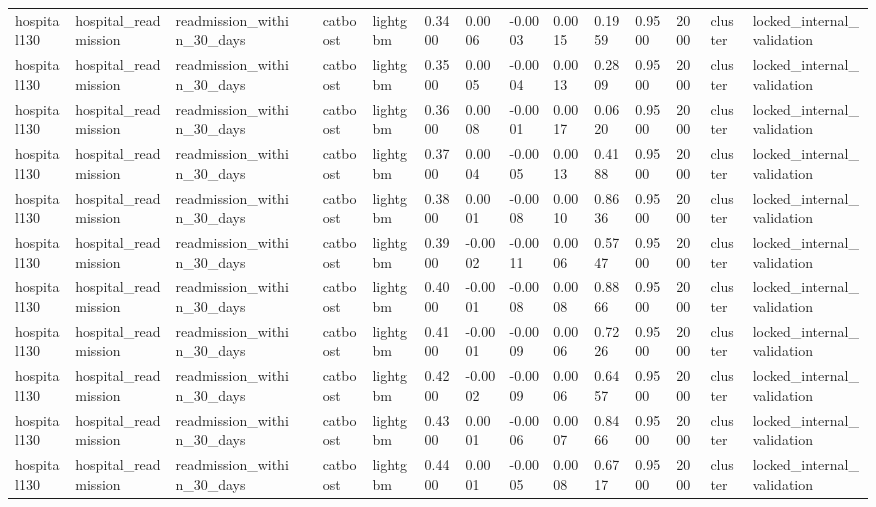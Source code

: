 \begin{tabular}{lllllllllllllll}
hospital130 & hospital\_readmission & readmission\_within\_30\_days &  & catboost & lightgbm & 0.3400 & 0.0006 & -0.0003 & 0.0015 & 0.1959 & 0.9500 & 2000 & cluster & locked\_internal\_validation \\
hospital130 & hospital\_readmission & readmission\_within\_30\_days &  & catboost & lightgbm & 0.3500 & 0.0005 & -0.0004 & 0.0013 & 0.2809 & 0.9500 & 2000 & cluster & locked\_internal\_validation \\
hospital130 & hospital\_readmission & readmission\_within\_30\_days &  & catboost & lightgbm & 0.3600 & 0.0008 & -0.0001 & 0.0017 & 0.0620 & 0.9500 & 2000 & cluster & locked\_internal\_validation \\
hospital130 & hospital\_readmission & readmission\_within\_30\_days &  & catboost & lightgbm & 0.3700 & 0.0004 & -0.0005 & 0.0013 & 0.4188 & 0.9500 & 2000 & cluster & locked\_internal\_validation \\
hospital130 & hospital\_readmission & readmission\_within\_30\_days &  & catboost & lightgbm & 0.3800 & 0.0001 & -0.0008 & 0.0010 & 0.8636 & 0.9500 & 2000 & cluster & locked\_internal\_validation \\
hospital130 & hospital\_readmission & readmission\_within\_30\_days &  & catboost & lightgbm & 0.3900 & -0.0002 & -0.0011 & 0.0006 & 0.5747 & 0.9500 & 2000 & cluster & locked\_internal\_validation \\
hospital130 & hospital\_readmission & readmission\_within\_30\_days &  & catboost & lightgbm & 0.4000 & -0.0001 & -0.0008 & 0.0008 & 0.8866 & 0.9500 & 2000 & cluster & locked\_internal\_validation \\
hospital130 & hospital\_readmission & readmission\_within\_30\_days &  & catboost & lightgbm & 0.4100 & -0.0001 & -0.0009 & 0.0006 & 0.7226 & 0.9500 & 2000 & cluster & locked\_internal\_validation \\
hospital130 & hospital\_readmission & readmission\_within\_30\_days &  & catboost & lightgbm & 0.4200 & -0.0002 & -0.0009 & 0.0006 & 0.6457 & 0.9500 & 2000 & cluster & locked\_internal\_validation \\
hospital130 & hospital\_readmission & readmission\_within\_30\_days &  & catboost & lightgbm & 0.4300 & 0.0001 & -0.0006 & 0.0007 & 0.8466 & 0.9500 & 2000 & cluster & locked\_internal\_validation \\
hospital130 & hospital\_readmission & readmission\_within\_30\_days &  & catboost & lightgbm & 0.4400 & 0.0001 & -0.0005 & 0.0008 & 0.6717 & 0.9500 & 2000 & cluster & locked\_internal\_validation \\

\end{tabular}
